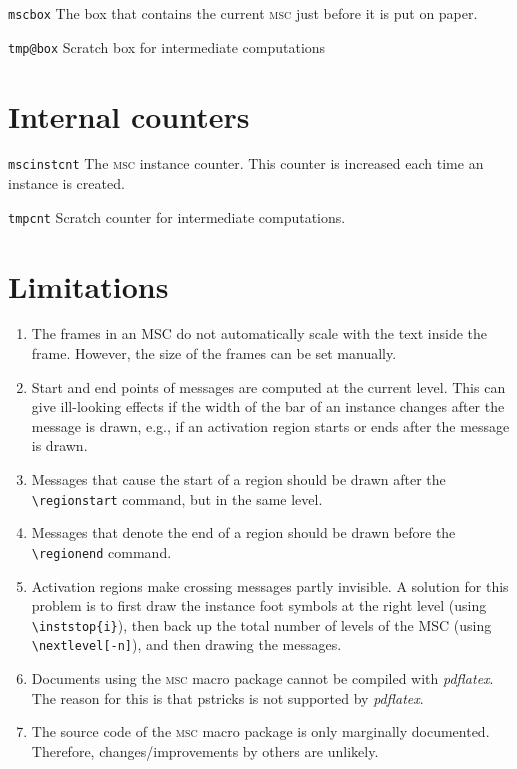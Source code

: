 \documentclass[a4paper]{article}
\newcommand{\cmd}[1]{\texttt{\bslash #1}}
\newcommand{\acro}[1]{{\scshape\lowercase{#1}}}
\newcommand\MSC{\acro{MSC}}
\newcommand{\mscpack}{\MSC{} macro package}
\newenvironment{defs}{%
  \begin{list}{}%
              {\setlength{\labelwidth}{0pt}%
               \setlength{\labelsep}{1em}%
               \setlength{\leftmargin}{1em}%
               \setlength{\parsep}{1ex}%
               \setlength{\listparindent}{0pt}%
               \setlength{\rightmargin}{0pt}%
               \renewcommand{\makelabel}[1]{##1}%
               \raggedright%
              }%
  }{%
  \end{list}}
\begin{document}
\begin{defs}

\item[\cmd{mscbox}]
The box that contains the current \MSC{} just before it is put on paper.

\item[\cmd{tmp@box}]
Scratch box for intermediate computations
\end{defs}


\section{Internal counters}

\begin{defs}
\item[\cmd{mscinstcnt}] The \MSC{} instance counter. This counter is
increased each time an instance is created.

\item[\cmd{tmpcnt}] Scratch counter for intermediate computations.

\end{defs}

\section{Limitations}

\begin{enumerate}

\item The frames in an MSC do not automatically scale with the text
inside the frame. However, the size of the frames can be set manually.

\item Start and end points of messages are computed at the current
level. This can give ill-looking effects if the width of the bar of an
instance changes after the message is drawn, e.g., if an activation
region starts or ends after the message is drawn.

\item Messages that cause the start of a region should be drawn after
the \verb|\regionstart| command, but in the same level.

\item Messages that denote the end of a region should be
drawn before the \verb|\regionend| command.

\item Activation regions make crossing messages partly invisible. A
solution for this problem is to first draw the instance foot symbols
at the right level (using \verb|\inststop{i}|), then back up the total
number of levels of the MSC (using \verb|\nextlevel[-n]|), and then
drawing the messages.


\item Documents using the \mscpack{} cannot be compiled with
\emph{pdflatex}. The reason for this is that \textsf{pstricks} is not
supported by \emph{pdflatex}.

\item The source code of the \mscpack{} is only marginally
documented. Therefore, changes/improvements by others are unlikely.

\end{enumerate}
\end{document}
